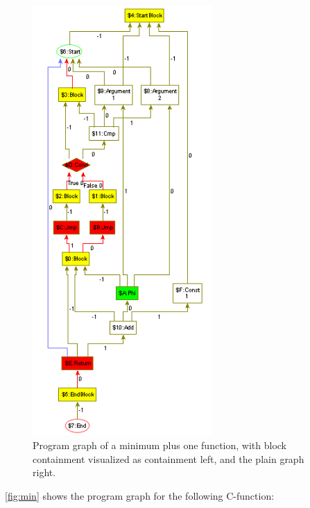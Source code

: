 \begin{figure}[htbp]
\begin{minipage}[c]{0.6\textwidth}
		\includegraphics[width=2.7in]{fig/MinPlusPureGraph.png}
	\end{minipage}
	\caption{Program graph of a minimum plus one function, with block containment visualized as containment left, and  the plain graph right.}
	\label{fig:min}
\end{figure}

\autoref{fig:min} shows the program graph for the following C-function:

\pagebreak



